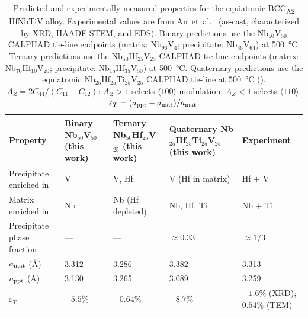\begin{table}[!h]
    \centering
    \caption{%
        Predicted and experimentally measured properties for the equiatomic
        BCC\textsubscript{A2} HfNbTiV alloy.
        Experimental values are from An~et~al.\ \cite{an2021spinodal} (as-cast,
        characterized by XRD, HAADF-STEM, and EDS).
        Binary predictions use the Nb$_{50}$V$_{50}$ CALPHAD tie-line endpoints
        (matrix: Nb$_{96}$V$_{4}$; precipitate: Nb$_{36}$V$_{64}$) at \SI{500}{\celsius}.
        Ternary predictions use the Nb$_{50}$Hf$_{25}$V$_{25}$ CALPHAD tie-line endpoints
        (matrix: Nb$_{70}$Hf$_{10}$V$_{20}$; precipitate: Nb$_{15}$Hf$_{35}$V$_{50}$) at \SI{500}{\celsius}.
        Quaternary predictions use the equiatomic Nb$_{25}$Hf$_{25}$Ti$_{25}$V$_{25}$ CALPHAD tie-line
        at \SI{500}{\celsius} ().
        $A_Z = 2C_{44}/(C_{11}-C_{12})$: $A_Z > 1$ selects
        $\langle 100 \rangle$ modulation, $A_Z < 1$ selects
        $\langle 110 \rangle$.
        $\varepsilon_T = (a_{\rm ppt} - a_{\rm mat})/a_{\rm mat}$.
    }
    \label{tab:elastic_comparison}
    \scriptsize
    \renewcommand{\arraystretch}{1.0}
    \setlength{\tabcolsep}{4pt}
    \begin{tabularx}{\textwidth}{lXXXX}
        \toprule
        Property
            & Binary Nb$_{50}$V$_{50}$ (this work)
            & Ternary Nb$_{50}$Hf$_{25}$V$_{25}$ (this work)
            & Quaternary Nb$_{25}$Hf$_{25}$Ti$_{25}$V$_{25}$ (this work)
            & Experiment \cite{an2021spinodal} \\
        \midrule
        Precipitate enriched in
            & V
            & V, Hf
            & V (Hf in matrix)
            & Hf $+$ V \\
        Matrix enriched in
            & Nb
            & Nb (Hf depleted)
            & Nb, Hf, Ti
            & Nb $+$ Ti \\
        Precipitate phase fraction
            & ---
            & ---
            & $\approx 0.33$
            & $\approx 1/3$ \\
        $a_{\rm mat}$ (\AA)
            & 3.312
            & 3.286
            & 3.382
            & 3.313 \\
        $a_{\rm ppt}$ (\AA)
            & 3.130
            & 3.265
            & 3.089
            & 3.259 \\
        $\varepsilon_T$
            & $-5.5\%$
            & $-0.64\%$
            & $-8.7\%$
            & $-1.6\%$ (XRD); $0.54\%$ (TEM) \\

\end{tabularx}
\end{table}
